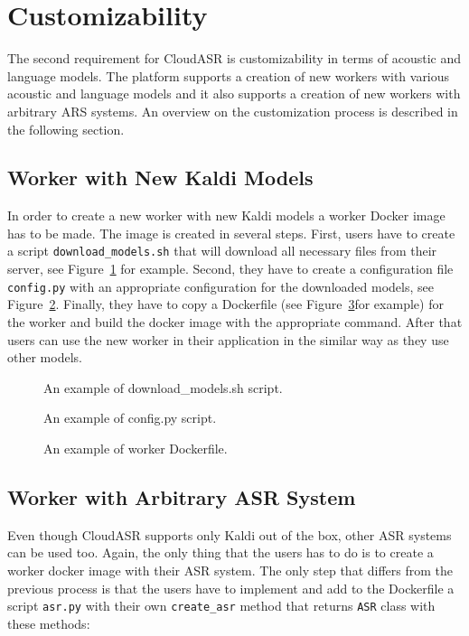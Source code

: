 \section{Customizability}
The second requirement for CloudASR is customizability in terms of acoustic and language models.
The platform supports a creation of new workers with various acoustic and language models and
  it also supports a creation of new workers with arbitrary ARS systems.
An overview on the customization process is described in the following section.


\subsection{Worker with New Kaldi Models}
In order to create a new worker with new Kaldi models a worker Docker image has to be made.
The image is created in several steps.
First, users have to create a script \texttt{download\_models.sh}
  that will download all necessary files from their server,
  see Figure~\ref{fig:download-models} for example.
Second, they have to create a configuration file \texttt{config.py} with an appropriate configuration for the downloaded models,
  see Figure~\ref{fig:config-py}.
Finally, they have to copy a Dockerfile (see Figure~\ref{fig:worker-dockerfile}for example) for the worker
  and build the docker image with the appropriate command.
After that users can use the new worker in their application in the similar way as they use other models.

\begin{figure}[h]
  

  \caption{An example of download\_models.sh script.}
  \label{fig:download-models}
\end{figure}

\begin{figure}[h]
  

  \caption{An example of config.py script.}
  \label{fig:config-py}
\end{figure}

\begin{figure}[h]
  

  \caption{An example of worker Dockerfile.}
  \label{fig:worker-dockerfile}
\end{figure}


\subsection{Worker with Arbitrary ASR System}
Even though CloudASR supports only Kaldi out of the box, other ASR systems can be used too.
Again, the only thing that the users has to do is to create a worker docker image with their ASR system.
The only step that differs from the previous process is
  that the users have to implement and add to the Dockerfile a script \texttt{asr.py} with their own \texttt{create\_asr} method
  that returns \texttt{ASR} class with these methods:

